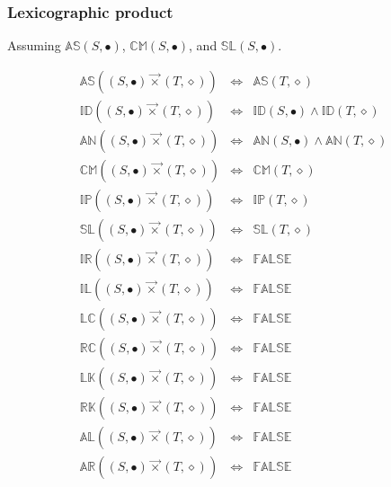 \documentclass[10pt]{article}
\newcommand{\propname}[1]{{\mathbb{#1}}}
\begin{document}
\subsubsection{Lexicographic product} 

Assuming 
$\propname{AS}(S, \bullet)$, 
$\propname{CM}(S, \bullet)$,  and 
$\propname{SL}(S, \bullet)$. 

\[
\begin{array}{rcl} 
\propname{AS}((S, \bullet) \vec{\times} (T, \diamond)) 
   & \Leftrightarrow %
   & \propname{AS}(T, \diamond) \\ 
\propname{ID}((S, \bullet) \vec{\times} (T, \diamond)) 
   & \Leftrightarrow %
   & \propname{ID}(S, \bullet) \wedge  \propname{ID}(T, \diamond) \\ 
\propname{AN}((S, \bullet) \vec{\times} (T, \diamond)) 
   & \Leftrightarrow %
   & \propname{AN}(S, \bullet) \wedge  \propname{AN}(T, \diamond) \\ 
\propname{CM}((S, \bullet) \vec{\times} (T, \diamond)) 
   & \Leftrightarrow %
   & \propname{CM}(T, \diamond) \\ 
\propname{IP}((S, \bullet) \vec{\times} (T, \diamond)) 
   & \Leftrightarrow %
   & \propname{IP}(T, \diamond) \\ 
\propname{SL}((S, \bullet) \vec{\times}  (T, \diamond)) 
   & \Leftrightarrow %
   & \propname{SL}(T, \diamond) \\ 
\propname{IR}((S, \bullet) \vec{\times}  (T, \diamond)) 
   & \Leftrightarrow %
   & \propname{FALSE} \\
\propname{IL}((S, \bullet) \vec{\times}  (T, \diamond)) 
   & \Leftrightarrow %
   & \propname{FALSE} \\
\propname{LC}((S, \bullet) \vec{\times} (T, \diamond)) 
   & \Leftrightarrow %
   & \propname{FALSE} \\
\propname{RC}((S, \bullet) \vec{\times} (T, \diamond)) 
   & \Leftrightarrow %
   & \propname{FALSE} \\
\propname{LK}((S, \bullet) \vec{\times} (T, \diamond)) 
   & \Leftrightarrow %
   & \propname{FALSE} \\
\propname{RK}((S, \bullet) \vec{\times} (T, \diamond)) 
   & \Leftrightarrow %
   & \propname{FALSE} \\
\propname{AL}((S, \bullet) \vec{\times}  (T, \diamond))  
   & \Leftrightarrow %
   & \propname{FALSE} \\
\propname{AR}((S, \bullet) \vec{\times}  (T, \diamond))  
   & \Leftrightarrow %
   & \propname{FALSE} \\
\end{array}
\] 
\end{document}
